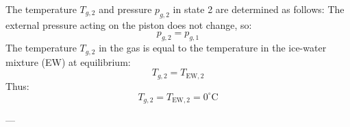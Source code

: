 The temperature \( T_{g,2} \) and pressure \( p_{g,2} \) in state 2 are determined as follows:  
The external pressure acting on the piston does not change, so:  
\[
p_{g,2} = p_{g,1}
\]  
The temperature \( T_{g,2} \) in the gas is equal to the temperature in the ice-water mixture (EW) at equilibrium:  
\[
T_{g,2} = T_{\text{EW},2}
\]  
Thus:  
\[
T_{g,2} = T_{\text{EW},2} = 0^\circ\text{C}
\]  

---